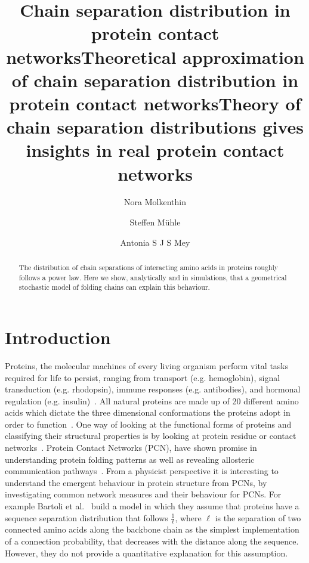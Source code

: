 \documentclass[
reprint,
twocolumn,
amsmath,amssymb,superscriptaddress,aps,
pre]{revtex4-1}
\begin{document}
\title{Chain separation distribution in protein contact networks}
\title{Theoretical approximation of chain separation distribution in protein contact networks}
\title{Theory of chain separation distributions gives insights in real protein contact networks}
\author{Nora Molkenthin}
\author{Steffen Mühle}
\author{Antonia S J S Mey}

\begin{abstract}
The distribution of chain separations of interacting amino acids in proteins roughly follows a power law. Here we show, analytically and in simulations, that a geometrical stochastic model of folding chains can explain this behaviour. 
\end{abstract}
\maketitle

\section*{Introduction}
Proteins, the molecular machines of every living organism perform vital tasks required for life to persist, ranging from transport (e.g. hemoglobin), signal transduction (e.g. rhodopsin), immune responses (e.g. antibodies), and hormonal regulation (e.g. insulin)~\cite{something}. All natural proteins are made up of 20 different amino acids which dictate the three dimensional conformations the proteins adopt in order to function~\cite{stuff}. One way of looking at the functional forms of proteins and classifying their structural properties is by looking at protein residue or contact networks~\cite{Vendruscolo2002,DiPaola2013,Estrada2011}. Protein Contact Networks (PCN), have shown promise in understanding protein folding patterns as well as revealing allosteric communication pathways~\cite{https://pubs.acs.org/doi/10.1021/acs.jcim.9b00320, and others}. 
From a physicist perspective it is interesting to understand the emergent behaviour in protein structure from PCNs, by investigating common network measures and their behaviour for PCNs. For example Bartoli et al.~\cite{bartoli2008effect} build a model in which they assume that proteins have a sequence separation distribution that follows $\frac{1}{\ell}$, where $\ell$ is the separation of two connected amino acids along the backbone chain as the simplest implementation of a connection probability, that decreases with the distance along the sequence. However, they do not provide a quantitative explanation for this assumption. 
\end{document}
